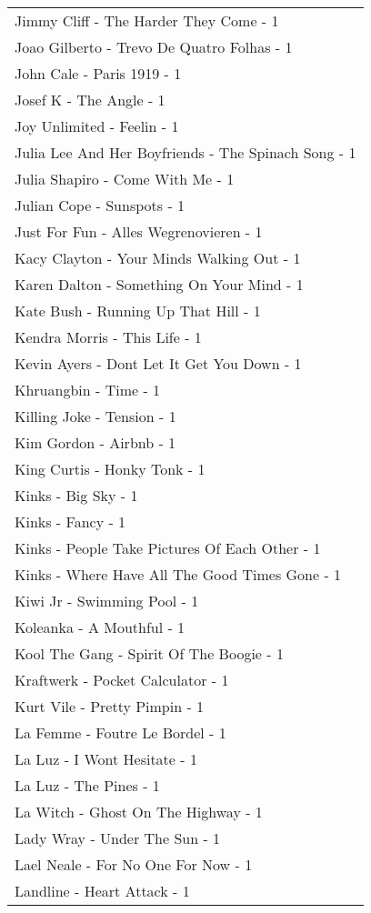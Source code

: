 \documentclass[
]{article}
\begin{document}
\begin{longtable}{l}
Jimmy Cliff - The Harder They Come - 1 \\ 
Joao Gilberto - Trevo De Quatro Folhas - 1 \\ 
John Cale - Paris 1919 - 1 \\ 
Josef K - The Angle - 1 \\ 
Joy Unlimited - Feelin - 1 \\ 
Julia Lee And Her Boyfriends - The Spinach Song - 1 \\ 
Julia Shapiro - Come With Me - 1 \\ 
Julian Cope - Sunspots - 1 \\ 
Just For Fun - Alles Wegrenovieren - 1 \\ 
Kacy Clayton - Your Minds Walking Out - 1 \\ 
Karen Dalton - Something On Your Mind - 1 \\ 
Kate Bush - Running Up That Hill - 1 \\ 
Kendra Morris - This Life - 1 \\ 
Kevin Ayers - Dont Let It Get You Down - 1 \\ 
Khruangbin - Time - 1 \\ 
Killing Joke - Tension - 1 \\ 
Kim Gordon - Airbnb - 1 \\ 
King Curtis - Honky Tonk - 1 \\ 
Kinks - Big Sky - 1 \\ 
Kinks - Fancy - 1 \\ 
Kinks - People Take Pictures Of Each Other - 1 \\ 
Kinks - Where Have All The Good Times Gone - 1 \\ 
Kiwi Jr - Swimming Pool - 1 \\ 
Koleanka - A Mouthful - 1 \\ 
Kool The Gang - Spirit Of The Boogie - 1 \\ 
Kraftwerk - Pocket Calculator - 1 \\ 
Kurt Vile - Pretty Pimpin - 1 \\ 
La Femme - Foutre Le Bordel - 1 \\ 
La Luz - I Wont Hesitate - 1 \\ 
La Luz - The Pines - 1 \\ 
La Witch - Ghost On The Highway - 1 \\ 
Lady Wray - Under The Sun - 1 \\ 
Lael Neale - For No One For Now - 1 \\ 
Landline - Heart Attack - 1 \\ 

\end{longtable}
\end{document}
